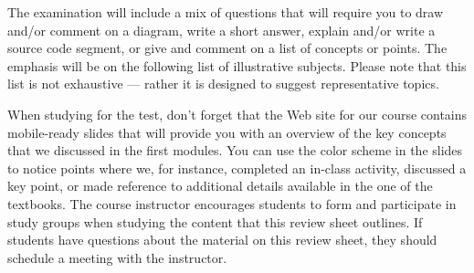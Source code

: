\documentclass[11pt]{article}
\begin{document}
\noindent The examination will include a mix of questions that will require you
to draw and/or comment on a diagram, write a short answer, explain and/or write
a source code segment, or give and comment on a list of concepts or points. The
emphasis will be on the following list of illustrative subjects. Please note
that this list is not exhaustive --- rather it is designed to suggest
representative topics.

When studying for the test, don't forget that the Web site for our course
contains mobile-ready slides that will provide you with an overview of the key
concepts that we discussed in the first modules. You can use the color scheme in
the slides to notice points where we, for instance, completed an in-class
activity, discussed a key point, or made reference to additional details
available in the one of the textbooks. The course instructor encourages students
to form and participate in study groups when studying the content that this
review sheet outlines. If students have questions about the material on this
review sheet, they should schedule a meeting with the instructor.
\end{document}
